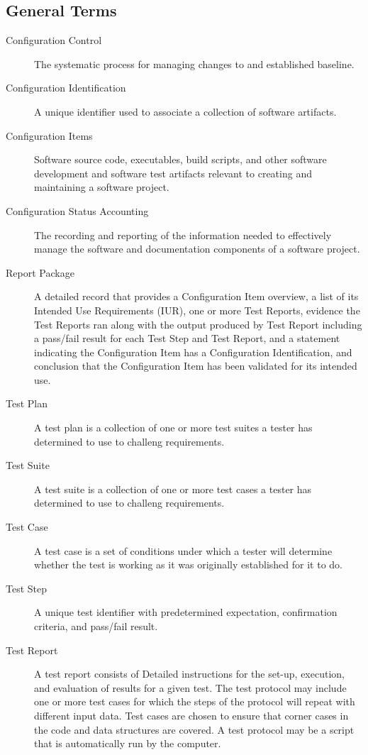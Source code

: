 \subsection{General Terms}
\begin{description}

\item[Configuration Control] \quad The systematic process for managing changes
  to and established baseline.

\item[Configuration Identification] \quad A unique identifier used to associate
  a collection of software artifacts.

\item[Configuration Items] \quad Software source code, executables, build
  scripts, and other software development and software test artifacts relevant
  to creating and maintaining a software project.

\item[Configuration Status Accounting] \quad The recording and reporting of the
  information needed to effectively manage the software and documentation
  components of a software project.

\item[Report Package] \quad A detailed record that provides a Configuration
  Item overview, a list of its Intended Use Requirements (IUR), one or more Test
  Reports, evidence the Test Reports ran along with the output produced by
  Test Report including a pass/fail result for each Test Step and Test
  Report, and a statement indicating the Configuration Item has
  a Configuration Identification, and conclusion that the Configuration Item has
  been validated for its intended use.

\item[Test Plan] \quad A test plan is a collection of one or more test suites
  a tester has determined to use to challeng requirements.

\item[Test Suite] \quad A test suite is a collection of one or more test cases 
  a tester has determined to use to challeng requirements.

\item[Test Case] \quad A test case is a set of conditions under which a tester
  will determine whether the test is working as it was originally established
  for it to do.

\item[Test Step] \quad A unique test identifier with predetermined expectation,
  confirmation criteria, and pass/fail result.

\item[Test Report] \quad A test report consists of Detailed instructions for
  the set-up, execution, and evaluation of results for a given test.  The test
  protocol may include one or more test cases for which the steps of the
  protocol will repeat with different input data. Test cases are chosen to
  ensure that corner cases in the code and data structures are covered. A test
  protocol may be a script that is automatically run by the computer.
\end{description}
